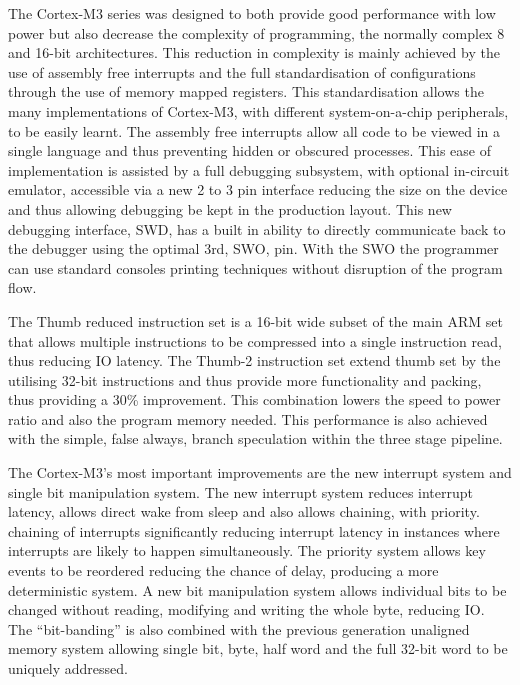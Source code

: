 The Cortex-M3 series was designed to both provide good performance with low power but also
decrease the complexity of programming, the normally complex 8 and 16-bit architectures. This
reduction in complexity is mainly achieved by the use of assembly free interrupts and the full
standardisation of configurations through the use of memory mapped registers. This standardisation
allows the many implementations of Cortex-M3, with different system-on-a-chip peripherals, to be
easily learnt. The assembly free interrupts allow all code to be viewed in a single language and thus
preventing hidden or obscured processes. This ease of implementation is assisted by a full debugging
subsystem, with optional in-circuit emulator, accessible via a new 2 to 3 pin interface reducing the
size on the device and thus allowing debugging be kept in the production layout. This new debugging
interface, \ac{SWD}, has a built in ability to directly communicate back to the
debugger using the optimal 3rd, \ac{SWO}, pin. With the \ac{SWO} the programmer can use
standard consoles printing techniques without disruption of the program flow.


The Thumb reduced instruction set is a 16-bit wide subset of the main ARM set that allows multiple
instructions to be compressed into a single instruction read, thus reducing \ac{IO} latency. The Thumb-2
instruction set extend thumb set by the utilising 32-bit instructions and thus provide more
functionality and packing, thus providing a 30\% improvement. This combination lowers the speed to
power ratio and also the program memory needed. This performance is also achieved with the
simple, false always, branch speculation within the three stage pipeline.


The Cortex-M3's most important improvements are the new interrupt system and single bit
manipulation system. The new interrupt system reduces interrupt latency, allows direct wake from
sleep and also allows chaining, with priority. chaining of interrupts significantly reducing interrupt
latency in instances where interrupts are likely to happen simultaneously. The priority system allows
key events to be reordered reducing the chance of delay, producing a more deterministic system. A
new bit manipulation system allows individual bits to be changed without reading, modifying and
writing the whole byte, reducing \ac{IO}. The ``bit-banding'' is also combined with the previous
generation unaligned memory system allowing single bit, byte, half word and the full 32-bit word to
be uniquely addressed.

